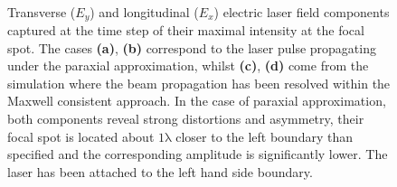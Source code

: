 \begin{figure}[h!]
	\centering
	\hspace{2mm}
	\\
	\hspace{2mm}
	\caption{Transverse ($ E_{y} $) and longitudinal ($ E_{x} $) electric laser field components captured at the time step of their maximal intensity at the focal spot. The cases \textbf{(a)}, \textbf{(b)} correspond to the laser pulse propagating under the paraxial approximation, whilst \textbf{(c)}, \textbf{(d)} come from the simulation where the beam propagation has been resolved within the Maxwell consistent approach. In the case of paraxial approximation, both components reveal strong distortions and asymmetry, their focal spot is located about $ \mathrm{1 \lambda} $ closer to the left boundary than specified and the corresponding amplitude is significantly lower. The laser has been attached to the left hand side boundary.}
	\label{fig:1}
\end{figure}

